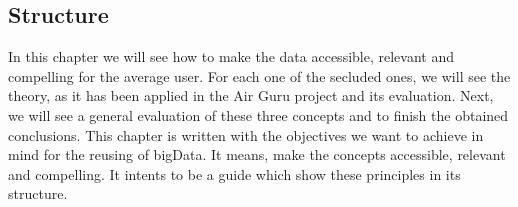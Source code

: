 \subsection*{Structure}

In this chapter we will see how to make the data accessible, relevant and compelling for 
the average user. For each one of the secluded ones, we will see the theory, as it has been applied
in the Air Guru project and its evaluation.
Next, we will see a general evaluation of these three concepts and to finish the 
obtained conclusions.
This chapter is written with the objectives we want to achieve in mind for the reusing of bigData. It means, make the 
concepts accessible, relevant and compelling. It intents to be a guide which show these principles
in its structure.